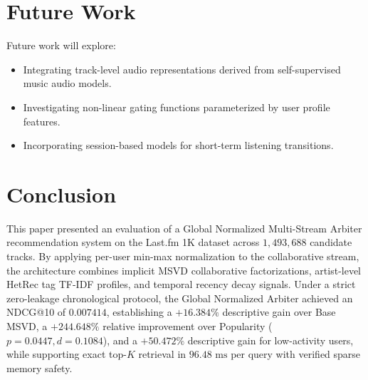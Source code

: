 \documentclass[conference]{IEEEtran}
\begin{document}
\section{Future Work}
Future work will explore:
\begin{itemize}
    \item Integrating track-level audio representations derived from self-supervised music audio models.
    \item Investigating non-linear gating functions parameterized by user profile features.
    \item Incorporating session-based models for short-term listening transitions.
\end{itemize}

\section{Conclusion}
This paper presented an evaluation of a Global Normalized Multi-Stream Arbiter recommendation system on the Last.fm 1K dataset across $1,493,688$ candidate tracks. By applying per-user min-max normalization to the collaborative stream, the architecture combines implicit MSVD collaborative factorizations, artist-level HetRec tag TF-IDF profiles, and temporal recency decay signals. Under a strict zero-leakage chronological protocol, the Global Normalized Arbiter achieved an NDCG@10 of $0.007414$, establishing a $+16.384\%$ descriptive gain over Base MSVD, a $+244.648\%$ relative improvement over Popularity ($p = 0.0447, d = 0.1084$), and a $+50.472\%$ descriptive gain for low-activity users, while supporting exact top-$K$ retrieval in $96.48\text{ ms}$ per query with verified sparse memory safety.

\balance


\end{document}
